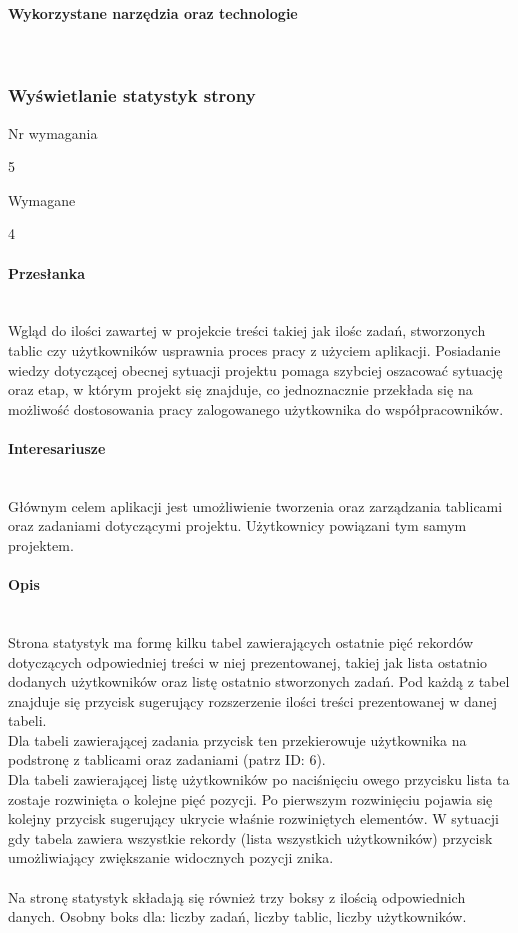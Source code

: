 \documentclass[eng,printmode]{mgr}
\begin{document}
\paragraph{Wykorzystane narzędzia oraz technologie}\ \\
\newpage

\subsubsection{Wyświetlanie statystyk strony}
\begin{labeling}{Nr wymagania}
\item [Nr wymagania:] 5
\item [Typ:] Wymagane
\item [Powiązania:] 4
\end{labeling}

\paragraph{Przesłanka}\ \\
Wgląd do ilości zawartej w projekcie treści takiej jak ilośc zadań, stworzonych tablic czy użytkowników  usprawnia proces pracy z użyciem aplikacji. Posiadanie wiedzy dotyczącej obecnej sytuacji projektu pomaga szybciej oszacować sytuację oraz etap, w którym projekt się znajduje, co jednoznacznie przekłada się na możliwość dostosowania pracy zalogowanego użytkownika do współpracowników.

\paragraph{Interesariusze}\ \\
Głównym celem aplikacji jest umożliwienie tworzenia oraz zarządzania tablicami oraz zadaniami dotyczącymi projektu. Użytkownicy powiązani tym samym projektem.

\paragraph{Opis}\ \\
Strona statystyk ma formę kilku tabel zawierających ostatnie pięć rekordów dotyczących odpowiedniej treści w niej prezentowanej, takiej jak lista ostatnio dodanych użytkowników oraz listę ostatnio stworzonych zadań. Pod każdą z tabel znajduje się przycisk sugerujący rozszerzenie ilości treści prezentowanej w danej tabeli.
\\
Dla tabeli zawierającej zadania przycisk ten przekierowuje użytkownika na podstronę z tablicami oraz zadaniami (patrz ID: 6). 
\\
Dla tabeli zawierającej listę użytkowników po naciśnięciu owego przycisku lista ta zostaje rozwinięta o kolejne pięć pozycji. Po pierwszym rozwinięciu pojawia się kolejny przycisk sugerujący ukrycie właśnie rozwiniętych elementów. W sytuacji gdy tabela zawiera wszystkie rekordy (lista wszystkich użytkowników) przycisk umożliwiający zwiększanie widocznych pozycji znika.
\\ \\
Na stronę statystyk składają się również trzy boksy z ilością odpowiednich danych. Osobny boks dla: liczby zadań, liczby tablic, liczby użytkowników.
\newpage
\end{document}
